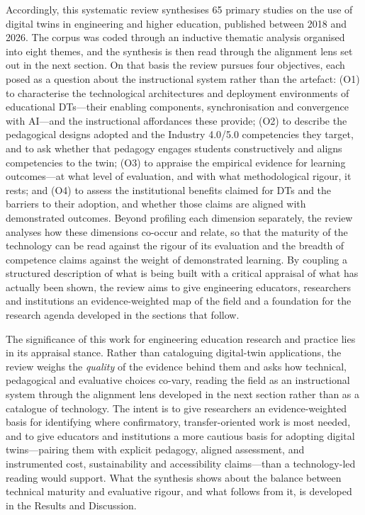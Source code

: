 Accordingly, this systematic review synthesises 65 primary studies on the use of
digital twins in engineering and higher education, published between 2018 and
2026. The corpus was coded through an inductive thematic analysis organised into
eight themes, and the synthesis is then read through the alignment lens set out in
the next section. On that basis the review pursues four objectives, each posed as
a question about the instructional system rather than the artefact: (O1) to
characterise the technological architectures and deployment environments of
educational DTs---their enabling components, synchronisation and convergence with
AI---and the instructional affordances these provide; (O2) to describe the
pedagogical designs adopted and the Industry 4.0/5.0 competencies they target, and
to ask whether that pedagogy engages students constructively and aligns
competencies to the twin; (O3) to appraise the empirical evidence for learning
outcomes---at what level of evaluation, and with what methodological rigour, it
rests; and (O4) to assess the institutional benefits claimed for DTs and the
barriers to their adoption, and whether those claims are aligned with demonstrated
outcomes. Beyond profiling each dimension separately, the review analyses how
these dimensions co-occur and relate, so that the maturity of the technology can
be read against the rigour of its evaluation and the breadth of competence claims
against the weight of demonstrated learning. By coupling a structured description
of what is being built with a critical appraisal of what has actually been shown,
the review aims to give engineering educators, researchers and institutions an
evidence-weighted map of the field and a foundation for the research agenda
developed in the sections that follow.

The significance of this work for engineering education research and practice lies
in its appraisal stance. Rather than cataloguing digital-twin applications, the
review weighs the \emph{quality} of the evidence behind them and asks how technical,
pedagogical and evaluative choices co-vary, reading the field as an instructional
system through the alignment lens developed in the next section rather than as a
catalogue of technology. The intent is to give researchers an evidence-weighted
basis for identifying where confirmatory, transfer-oriented work is most needed,
and to give educators and institutions a more cautious basis for adopting digital
twins---pairing them with explicit pedagogy, aligned assessment, and instrumented
cost, sustainability and accessibility claims---than a technology-led reading would
support. What the synthesis shows about the balance between technical maturity and
evaluative rigour, and what follows from it, is developed in the Results and
Discussion.

